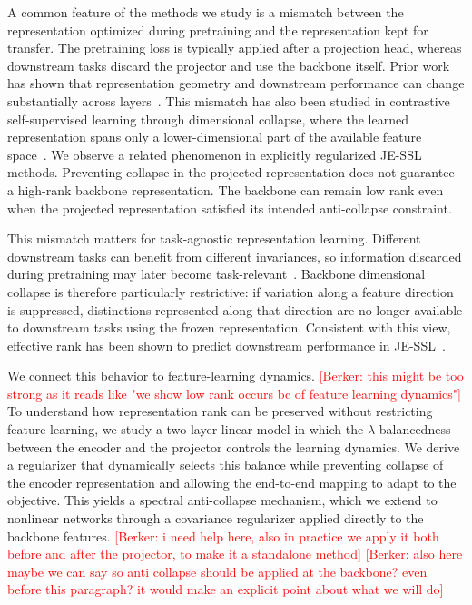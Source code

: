 \documentclass{article} %
\theoremstyle{remark}
\newcommand{\BD}[1]{\textcolor{red}{[Berker: #1]}}
\begin{document}
A common feature of the methods we study is a mismatch between the representation optimized during pretraining and the representation kept for transfer. The pretraining loss is typically applied after a projection head, whereas downstream tasks discard the projector and use the backbone itself. Prior work has shown that representation geometry and downstream performance can change substantially across layers~\citep{guillotinebordes2023}. This mismatch has also been studied in contrastive self-supervised learning through dimensional collapse, where the learned representation spans only a lower-dimensional part of the available feature space~\citep{understandingjing2022}. We observe a related phenomenon in explicitly regularized JE-SSL methods. Preventing collapse in the projected representation does not guarantee a high-rank backbone representation. The backbone can remain low rank even when the projected representation satisfied its intended anti-collapse constraint.

This mismatch matters for task-agnostic representation learning. Different downstream tasks can benefit from different invariances, so information discarded during pretraining may later become task-relevant~\citep{wellericsson2021, tian2020makes}. Backbone dimensional collapse is therefore particularly restrictive: if variation along a feature direction is suppressed, distinctions represented along that direction are no longer available to downstream tasks using the frozen representation. Consistent with this view, effective rank has been shown to predict downstream performance in JE-SSL~\citep{rankme2023}.

We connect this behavior to feature-learning dynamics. \BD{this might be too strong as it reads like "we show low rank occurs bc of feature learning dynamics"} To understand how representation rank can be preserved without restricting feature learning, we study a two-layer linear model in which the $\lambda$-balancedness between the encoder and the projector controls the learning dynamics. We derive a regularizer that dynamically selects this balance while preventing collapse of the encoder representation and allowing the end-to-end mapping to adapt to the objective. This yields a spectral anti-collapse mechanism, which we extend to nonlinear networks through a covariance regularizer applied directly to the backbone features. \BD{i need help here, also in practice we apply it both before and after the projector, to make it a standalone method} \BD{also here maybe we can say so anti collapse should be applied at the backbone? even before this paragraph? it would make an explicit point about what we will do}
\end{document}
